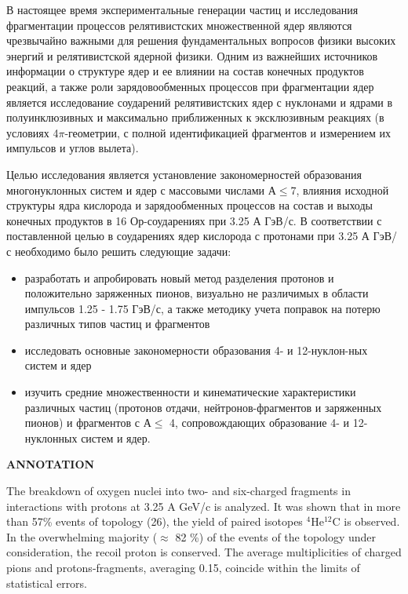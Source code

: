 \documentclass[fontsize=14pt]{scrarticle}
\begin{document}
   В настоящее время экспериментальные генерации частиц и исследования     фрагментации процессов релятивистских множественной ядер являются чрезвычайно важными для решения фундаментальных вопросов физики  высоких энергий и релятивистской ядерной физики. Одним из важнейших источников информации о структуре ядер и ее влиянии на состав конечных продуктов реакций, а также роли зарядовообменных процессов при фрагментации ядер является исследование соударений релятивистских ядер с нуклонами и ядрами в полуинклюзивных и максимально приближенных к эксклюзивным реакциях (в условиях 4$\pi$-геометрии, с полной идентификацией фрагментов и измерением их импульсов и углов вылета). 
   
   Целью исследования является установление закономерностей образования многонуклонных систем и ядер с массовыми числами А$\le$7, влияния исходной структуры ядра кислорода и зарядообменных процессов на состав и выходы конечных продуктов в 16 Ор-соударениях при 3.25 А ГэВ/с. В соответствии с поставленной целью в соударениях ядер кислорода с протонами при 3.25 А ГэВ/с необходимо было решить следующие задачи:
\begin{itemize}
    \item разработать и апробировать новый метод разделения протонов и положительно заряженных пионов, визуально не различимых в области импульсов 1.25 - 1.75 ГэВ/с, а также методику учета поправок на потерю различных типов частиц и фрагментов
    \item исследовать основные закономерности образования 4- и 12-нуклон-ных систем и ядер
    \item изучить средние множественности и кинематические характеристики различных частиц (протонов отдачи, нейтронов-фрагментов и заряженных пионов) и фрагментов с А$\le$ 4, сопровождающих образование 4- и 12- нуклонных систем и ядер.
    \end{itemize}
    
\newpage
	\thispagestyle{plain}
\begin{center}
    \large
    \textbf{ANNOTATION}\\
\end{center}
    \hspace{0.6cm}The breakdown of oxygen nuclei into two- and six-charged fragments in interactions with protons at 3.25 A GeV/c is analyzed. It was shown that in more than 57\% events of topology (26), the yield of paired isotopes $^{4}$He$^{12}$C is observed. In the overwhelming majority ($\approx$ 82 \%) of the events of the topology under consideration, the recoil proton is conserved. The average multiplicities of charged pions and protons-fragments, averaging 0.15, coincide within the limits of statistical errors.
   
\end{document}
